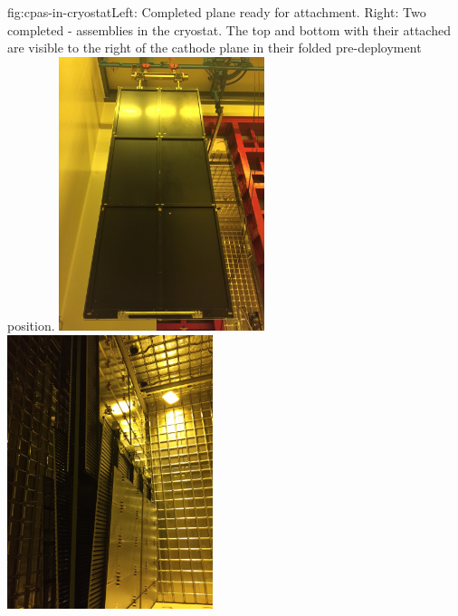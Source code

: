 \begin{dunefigure}{fig:cpas-in-cryostat}{Left: Completed   plane ready for  attachment. Right: Two completed - assemblies in the  cryostat. The top and bottom  with their  attached are visible to the right of the cathode plane in their folded pre-deployment position.}
\includegraphics[width=0.45\textwidth]{graphics/lastcpa}
\includegraphics[width=0.45\textwidth]{graphics/2cpas-in-cryostat}
\end{dunefigure}

